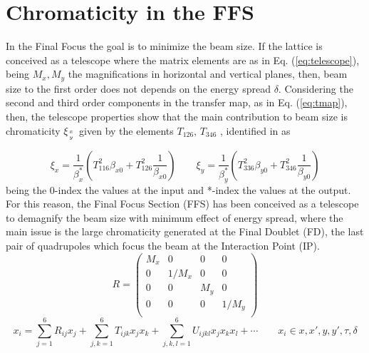 \chapter{Chromaticity in the FFS}\label{s:FFS}
In the Final Focus the goal is to minimize the beam size. If the lattice is conceived as a telescope where the matrix elements are as in Eq. (\ref{eq:telescope}), being $M_x, M_y$ the magnifications in horizontal and vertical planes, then, beam size to the first order does not depends on the energy spread $\delta$. Considering the second and third order components in the transfer map, as in Eq. (\ref{eq:tmap}), then, the telescope properties show that the main contribution to beam size is chromaticity $\xi_{x\atop y}$ given by the elements $T_{126},\,T_{346}$  \cite{Brown:1987}, identified in \cite{GarciaMorales:1982827} as\par
\begin{equation}
 \xi_x = \frac{1}{\beta_x^*}\left(T_{116}^2\beta_{x0}+T_{126}^2\frac{1}{\beta_{x0}}\right)\qquad
 \xi_y = \frac{1}{\beta_y^*}\left(T_{336}^2\beta_{y0}+T_{346}^2\frac{1}{\beta_{y0}}\right)
\end{equation}
being the 0-index the values at the input and *-index the values at the output. For this reason, the Final Focus Section (FFS) has been conceived as a telescope to demagnify the beam size with minimum effect of energy spread, where the main issue is the large chromaticity generated at the Final Doublet (FD), the last pair of quadrupoles which focus the beam at the Interaction Point (IP).
\begin{equation}
R=
 \begin{pmatrix}
   M_x & 0 & 0 & 0 \\
   0 & 1/M_x & 0 & 0 \\
   0 & 0 & M_y & 0 \\
   0 & 0 & 0 & 1/M_y \\
  \end{pmatrix}\label{eq:telescope}
\end{equation}
\begin{equation}
x_i=\sum_{j=1}^6R_{ij}x_j+\sum_{j,k=1}^6T_{ijk}x_jx_k+\sum_{j,k,l=1}^6U_{ijkl}x_jx_kx_l+\cdots\qquad x_i\in x,x',y,y',\tau,\delta\label{eq:tmap}
\end{equation}

